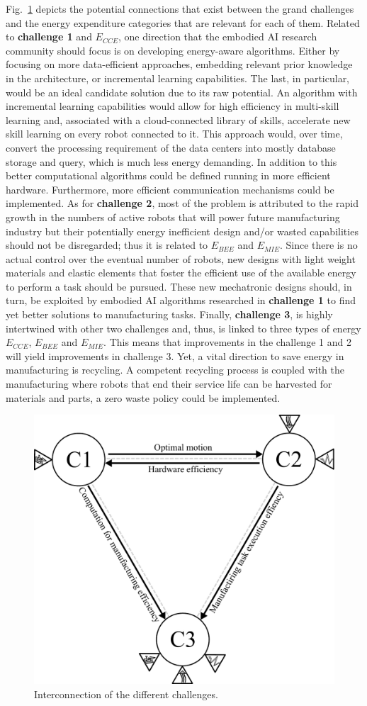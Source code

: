 Fig.~\ref{fig:challengesConnected} depicts the potential connections that exist between the grand challenges and the energy expenditure categories that are relevant for each of them. Related to \textbf{challenge 1} and $E_{CCE}$, one direction that the embodied AI research community should focus is on developing energy-aware algorithms. Either by focusing on more data-efficient approaches, embedding relevant prior knowledge in the architecture, or incremental learning capabilities. The last, in particular, would be an ideal candidate solution due to its raw potential. An algorithm with incremental learning capabilities would allow for high efficiency in multi-skill learning and, associated with a cloud-connected library of skills, accelerate new skill learning on every robot connected to it. This approach would, over time, convert the processing requirement of the data centers into mostly database storage and query, which is much less energy demanding. In addition to this better computational algorithms could be defined running in more efficient hardware. Furthermore, more efficient communication mechanisms could be implemented. As for \textbf{challenge 2}, most of the problem is attributed to the rapid growth in the numbers of active robots that will power future manufacturing industry but their potentially energy inefficient design and/or wasted capabilities should not be disregarded; thus it is related to $E_{BEE}$ and $E_{MIE}$. Since there is no actual control over the eventual number of robots, new designs with light weight materials and elastic elements that foster the efficient use of the available energy to perform a task should be pursued. These new mechatronic designs should, in turn, be exploited by embodied AI algorithms researched in \textbf{challenge 1} to find yet better solutions to manufacturing tasks. Finally, \textbf{challenge 3}, is highly intertwined with other two challenges and, thus, is linked to three types of energy $E_{CCE}$, $E_{BEE}$ and $E_{MIE}$. This means that improvements in the challenge 1 and 2 will yield improvements in challenge 3. Yet, a vital direction to save energy in manufacturing is recycling. A competent recycling process is coupled with the manufacturing where robots that end their service life can be harvested for materials and parts, a zero waste policy could be implemented. 
\begin{figure}[!t]
	\centering
	\includegraphics[width=0.9\columnwidth]{fig/grand_challenges_connections_v2.pdf}
	\caption{Interconnection of the different challenges.}
	\label{fig:challengesConnected}
\end{figure}
